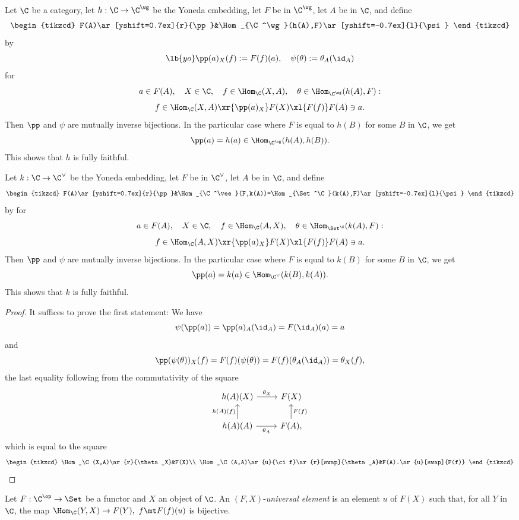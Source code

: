\documentclass[12pt]{article}
\theoremstyle{remark}
\theoremstyle{definition}
\begin{document}
\begin{thm}
Let $\C$ be a category, let $h:\C\to\C^\wg$ be the Yoneda embedding, let $F$ be in $\C^\wg$, let $A$ be in $\C$, and define 
$$
\begin{tikzcd} 
F(A)\ar[yshift=0.7ex]{r}{\pp}&\Hom_{\C^\wg}(h(A),F)\ar[yshift=-0.7ex]{l}{\psi}
\end{tikzcd}
$$
by 
\begin{equation}\lb{yo}
\pp(a)_X(f):=F(f)(a),\quad\psi(\theta):=\theta_A(\id_A)
\end{equation}
for 
$$
a\in F(A),\quad X\in\C,\quad f\in\Hom_\C(X,A),\quad\theta\in\Hom_{\C^\wg}(h(A),F):
$$ 
$$
f\in\Hom_\C(X,A)\xr{\pp(a)_X}F(X)\xl{F(f)}F(A)\ni a.
$$
Then $\pp$ and $\psi$ are mutually inverse bijections. In the particular case where $F$ is equal to $h(B)$ for some $B$ in $\C$, we get 
$$
\pp(a)=h(a)\in\Hom_{\C^\wg}(h(A),h(B)).
$$
This shows that $h$ is fully faithful.

Let $k:\C\to\C^\vee$ be the Yoneda embedding, let $F$ be in $\C^\vee$, let $A$ be in $\C$, and define 
$$
\begin{tikzcd} 
F(A)\ar[yshift=0.7ex]{r}{\pp}&\Hom_{\C^\vee}(F,k(A))=\Hom_{\Set^\C}(k(A),F)\ar[yshift=-0.7ex]{l}{\psi}
\end{tikzcd}
$$
by  for 
$$
a\in F(A),\quad X\in\C,\quad f\in\Hom_\C(A,X),\quad\theta\in\Hom_{\Set^\C}(k(A),F):
$$ 
$$
f\in\Hom_\C(A,X)\xr{\pp(a)_X}F(X)\xl{F(f)}F(A)\ni a.
$$
Then $\pp$ and $\psi$ are mutually inverse bijections. In the particular case where $F$ is equal to $k(B)$ for some $B$ in $\C$, we get 
$$
\pp(a)=k(a)\in\Hom_{\C^\vee}(k(B),k(A)).
$$
This shows that $k$ is fully faithful.
\end{thm}
%
\begin{proof}
It suffices to prove the first statement: We have 
$$
\psi(\pp(a))=\pp(a)_A(\id_A)=F(\id_A)(a)=a
$$ 
and
$$
\pp(\psi(\theta))_X(f)=F(f)(\psi(\theta))=F(f)(\theta_A(\id_A))=\theta_X(f),
$$ 
the last equality following from the commutativity of the square 
$$
\begin{tikzcd}
h(A)(X)\ar{r}{\theta_X}&F(X)\\ 
h(A)(A)\ar{u}{h(A)(f)}\ar{r}[swap]{\theta_A}&F(A),\ar{u}[swap]{F(f)}
\end{tikzcd}
$$ 
which is equal to the square 
$$
\begin{tikzcd}
\Hom_\C(X,A)\ar{r}{\theta_X}&F(X)\\ 
\Hom_\C(A,A)\ar{u}{\ci f}\ar{r}[swap]{\theta_A}&F(A).\ar{u}[swap]{F(f)}
\end{tikzcd}
$$
\end{proof}
%
\begin{df} 
Let $F:\C^{\op}\to\Set$ be a functor and $X$ an object of $\C$. An $(F,X)$\--{\em universal element} is an element $u$ of $F(X)$ such that, for all $Y$ in $\C$, the map $\Hom_\C(Y,X)\to F(Y),\ f\mt F(f)(u)$ is bijective. 
\end{df}
\end{document}
